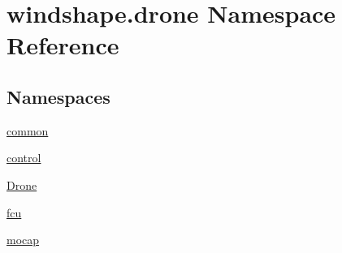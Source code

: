 \hypertarget{namespacewindshape_1_1drone}{}\section{windshape.\+drone Namespace Reference}
\label{namespacewindshape_1_1drone}
\subsection*{Namespaces}
\begin{DoxyCompactItemize}
\item 
 \mbox{\hyperlink{namespacewindshape_1_1drone_1_1common}{common}}
\item 
 \mbox{\hyperlink{namespacewindshape_1_1drone_1_1control}{control}}
\item 
 \mbox{\hyperlink{namespacewindshape_1_1drone_1_1_drone}{Drone}}
\item 
 \mbox{\hyperlink{namespacewindshape_1_1drone_1_1fcu}{fcu}}
\item 
 \mbox{\hyperlink{namespacewindshape_1_1drone_1_1mocap}{mocap}}
\end{DoxyCompactItemize}

